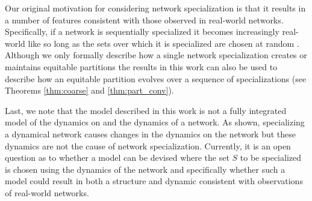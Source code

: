 \documentclass[12pt]{thesis}
\begin{document}
Our original motivation for considering network specialization is that it results in a number of features consistent with those observed in real-world networks. Specifically, if a network is sequentially specialized it becomes increasingly real-world like so long as the sets over which it is specialized are chosen at random \cite{8}. Although we only formally describe how a single network specialization creates or maintains equitable partitions the results in this work can also be used to describe how an equitable partition evolves over a sequence of specializations (see Theorems \ref{thm:coarse} and \ref{thm:part_conv}).

Last, we note that the model described in this work is not a fully integrated model of the {dynamics on} and the {dynamics of} a network. As shown, specializing a dynamical network causes changes in the dynamics on the network but these dynamics are not the cause of network specialization. Currently, it is an open question as to whether a model can be devised where the set $S$ to be specialized is chosen using the dynamics of the network and specifically whether such a model could result in both a structure and dynamic consistent with observations of real-world networks.


\appendix

% 
% 
\end{document}
